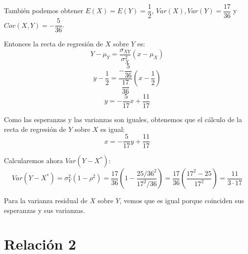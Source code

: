 \documentclass[openany]{book}
\begin{document}
\begin{exercise}
    También podemos obtener $ E(X) = E(Y) = \dfrac{1}{2} $, $ Var(X),Var(Y) = \dfrac{17}{36} $ y $ Cov(X,Y) = -\dfrac{5}{36} $.

    Entonces la recta de regresión de $ X $ sobre $ Y $ es:
    $$ Y-\mu_{Y} = \dfrac{\sigma_{XY}}{\sigma_{X}^2}(x-\mu_{X}) $$
    $$ y-\dfrac{1}{2} = \dfrac{-\dfrac{5}{36}}{\dfrac{17}{36}} \left(x-\dfrac{1}{2}\right) $$
    $$ y = -\dfrac{5}{17}x+\dfrac{11}{17} $$
    
    Como las esperanzas y las varianzas son iguales, obtenemos que el cálculo de la recta de regresión de $ Y $ sobre $ X $ es igual:
    $$ x = -\dfrac{5}{17}y+\dfrac{11}{17} $$

    Calcularemos ahora $ Var(Y-X^*) $:
    $$ Var(Y-X^* ) = \sigma_{Y}^2 (1-\rho ^2) = \dfrac{17}{36} \left( 1-\dfrac{25/36^2}{17^2/36} \right) = \dfrac{17}{36} \left( \dfrac{17^2-25}{17^2}\right) = \dfrac{11}{3\cdot 17}  $$

    Para la varianza residual de $ X $ sobre $ Y $, vemos que es igual porque coinciden sus esperanzas y sus varianzas.


\end{exercise}


\chapter{Relación 2}
\end{document}
